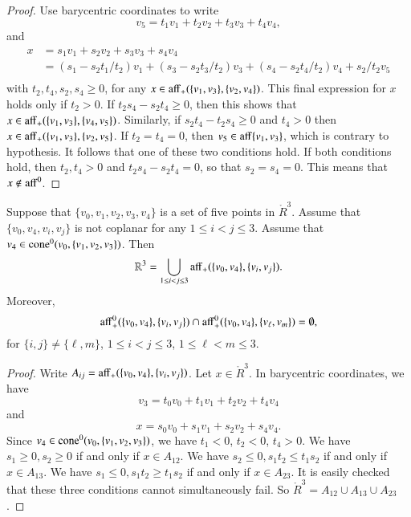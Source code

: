 \begin{tarskidata}
\begin{tarski}
\begin{proof}
Use barycentric coordinates to write
   $$
   v_5 = t_1 v_1 + t_2 v_2 + t_3 v_3 + t_4 v_4,
   $$
and 
    $$
    \begin{array}{lll}
    x &= s_1 v_1 + s_2 v_2 + s_3 v_3 + s_4 v_4 \\
      &= (s_1 - s_2 t_1/t_2) v_1 + (s_3 - s_2 t_3/t_2) v_3 +
        (s_4 - s_2 t_4/t_2) v_4 + s_2/t_2 v_5\\
    \end{array}
    $$
with $t_2,t_4,s_2,s_4\ge 0$,
for any $x\in{\operatorname{aff}}_+(\{v_1,v_3\},\{v_2,v_4\})$. 
This final expression for $x$ holds only if $t_2>0$.   
If $t_2 s_4 - s_2 t_4 \ge 0$, then this shows that 
$x\in{\operatorname{aff}}_+(\{v_1,v_3\},\{v_4,v_5\})$.
Similarly, if $s_2 t_4 - t_2 s_4\ge 0$ and $t_4>0$ then
$x\in{\operatorname{aff}}_+(\{v_1,v_3\},\{v_2,v_5\}$.
If $t_2=t_4=0$, then $v_5\in{\operatorname{aff}}\{v_1,v_3\}$, which is
contrary to hypothesis.  It follows that one of these two
conditions hold.  If both conditions hold, then $t_2,t_4>0$
and $t_2 s_4 - s_2 t_4 =0$, so that $s_2=s_4 = 0$.  This means
that $x\not\in{\operatorname{aff}}^0$.
\end{proof}
\end{tarski}





\begin{tarski}

\begin{lemma}
Suppose that $\{v_0,v_1,v_2,v_3,v_4\}$ is a set
of five points in $\ring{R}^3$.  Assume that $\{v_0,v_4,v_i,v_j\}$
is not coplanar for any $1\le i < j \le 3$.
Assume that $v_4\in{\operatorname{cone}}^0(v_0,\{v_1,v_2,v_3\})$.
Then 
   $$
   \mathbb{R}^3 = \bigcup_{1\le i<j\le 3}
    {\operatorname{aff}}_+(\{v_0,v_4\},\{v_i,v_j\}).
   $$
Moreover,
   $$
   {\operatorname{aff}}_+^0(\{v_0,v_4\},\{v_i,v_j\}) \cap
   {\operatorname{aff}}_+^0(\{v_0,v_4\},\{v_\ell,v_m\}) =\emptyset,
   $$
for $\{i,j\}\ne \{\ell,m\}$, $1\le i<j\le 3$, $1\le \ell<m\le 3$.
\end{lemma}

\begin{proof} Write $A_{ij} = {\operatorname{aff}}_+(\{v_0,v_4\},\{v_i,v_j\})$.
  Let $x\in\ring{R}^3$.  In barycentric coordinates, we have
  $$
  v_3 = t_0 v_0 + t_1 v_1 + t_2 v_2 + t_4 v_4
  $$
and
$$
  x = s_0 v_0 + s_1 v_1 + s_2 v_2 + s_4 v_4.
$$
Since $v_4\in{\operatorname{cone}}^0(v_0,\{v_1,v_2,v_3\})$, we have
$t_1<0$, $t_2<0$, $t_4>0$.  
We have $s_1\ge0,s_2\ge0$ if and only if $x\in A_{12}$.
We have $s_2\le0,s_1t_2\le t_1s_2$ if and only if $x\in A_{13}$.
We have $s_1\le0,s_1t_2\ge t_1s_2$ if and only if $x\in A_{23}$.
It is easily checked that these three conditions cannot simultaneously
fail.  So $\ring{R}^3 = A_{12}\cup A_{13}\cup A_{23}$.


\end{proof}
\end{tarski}
\end{tarskidata}
